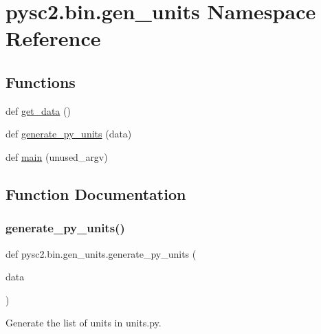 \hypertarget{namespacepysc2_1_1bin_1_1gen__units}{}\section{pysc2.\+bin.\+gen\+\_\+units Namespace Reference}
\label{namespacepysc2_1_1bin_1_1gen__units}
\subsection*{Functions}
\begin{DoxyCompactItemize}
\item 
def \mbox{\hyperlink{namespacepysc2_1_1bin_1_1gen__units_afbee460d672176cde392d0723b8ee83f}{get\+\_\+data}} ()
\item 
def \mbox{\hyperlink{namespacepysc2_1_1bin_1_1gen__units_adcfd848632de9c84d3dc17ce965157fd}{generate\+\_\+py\+\_\+units}} (data)
\item 
def \mbox{\hyperlink{namespacepysc2_1_1bin_1_1gen__units_acb19fa96257021a40f623e714885428f}{main}} (unused\+\_\+argv)
\end{DoxyCompactItemize}


\subsection{Function Documentation}
\mbox{\label{namespacepysc2_1_1bin_1_1gen__units_adcfd848632de9c84d3dc17ce965157fd}} 
\subsubsection{\texorpdfstring{generate\+\_\+py\+\_\+units()}{generate\_py\_units()}}
{\footnotesize\ttfamily def pysc2.\+bin.\+gen\+\_\+units.\+generate\+\_\+py\+\_\+units (\begin{DoxyParamCaption}\item[{}]{data }\end{DoxyParamCaption})}

\begin{DoxyVerb}Generate the list of units in units.py.\end{DoxyVerb}
 \mbox{\label{namespacepysc2_1_1bin_1_1gen__units_afbee460d672176cde392d0723b8ee83f}} 
